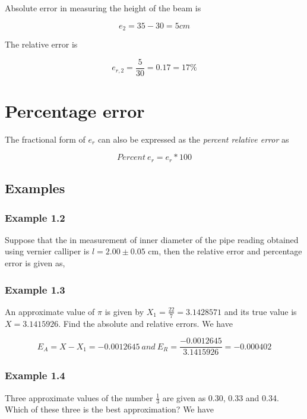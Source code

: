 \documentclass[11pt, a4paper, oneside]{book}
\begin{document}
              Absolute error in measuring the height of the beam is

              \begin{equation*}
                e_2=35-30=5 cm
              \end{equation*}

              The relative error is

              \begin{equation*}
                e_{r,2}=\frac{5}{30}=0.17=17\%
              \end{equation*}


        \section{Percentage error}
          The fractional form of $e_r$ can also be expressed as the
          \textit{percent relative error} as

        \begin{equation*}
        Percent\ e_r=e_r*100
        \end{equation*}

          \subsection{Examples}
            \subsubsection{Example 1.2}
              Suppose that the in measurement of inner diameter of the pipe reading
              obtained using vernier calliper is $l=2.00\pm0.05$ cm, then the relative
              error and percentage error is given as,

            \subsubsection{Example 1.3}
              An approximate value of $\pi$ is given by $X_1=\frac{22}{7}=3.1428571$
              and its true value is $X=3.1415926$. Find the absolute and relative errors.
              We have

              \begin{equation*}
                E_A=X-X_1=-0.0012645\ and\ E_R=\frac{-0.0012645}{3.1415926}=-0.000402
              \end{equation*}

            \subsubsection{Example 1.4}
              Three approximate values of the number $\frac{1}{3}$ are given as 0.30, 0.33
              and 0.34. Which of these three is the best approximation? We have
\end{document}

